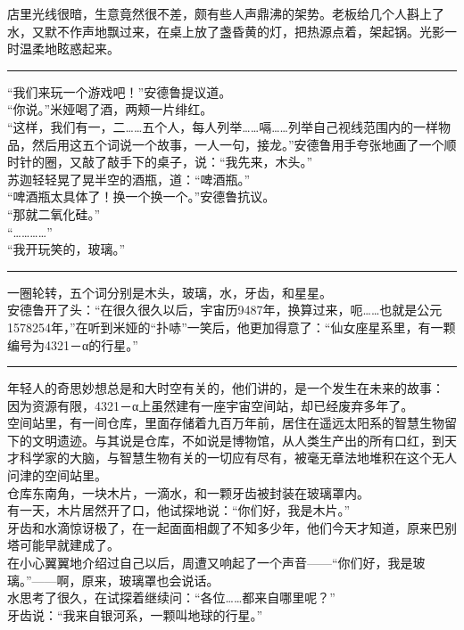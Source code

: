 \documentclass[oneside,11pt]{memoir} %
\begin{document}
\begin{CJK}{UTF8}{gbsn}
     店里光线很暗，生意竟然很不差，颇有些人声鼎沸的架势。老板给几个人斟上了水，又默不作声地飘过来，在桌上放了盏昏黄的灯，把热源点着，架起锅。光影一时温柔地眩惑起来。\\\indent
\rule{-3pt}{30pt}
     “我们来玩一个游戏吧！”安德鲁提议道。\\\indent
     “你说。”米娅喝了酒，两颊一片绯红。\\\indent
     “这样，我们有一，二……五个人，每人列举……嗝……列举自己视线范围内的一样物品，然后用这五个词说一个故事，一人一句，接龙。”安德鲁用手夸张地画了一个顺时针的圈，又敲了敲手下的桌子，说：“我先来，木头。”\\\indent
     苏迦轻轻晃了晃半空的酒瓶，道：“啤酒瓶。”\\\indent
     “啤酒瓶太具体了！换一个换一个。”安德鲁抗议。\\\indent
     “那就二氧化硅。”\\\indent
     “…………”\\\indent
     “我开玩笑的，玻璃。”\\\indent
\rule{-3pt}{30pt}
    一圈轮转，五个词分别是木头，玻璃，水，牙齿，和星星。\\\indent
    安德鲁开了头：“在很久很久以后，宇宙历9487年，换算过来，呃……也就是公元1578254年，”在听到米娅的“扑哧”一笑后，他更加得意了：“仙女座星系里，有一颗编号为4321－α的行星。”\\\indent
\rule{-3pt}{30pt}
    年轻人的奇思妙想总是和大时空有关的，他们讲的，是一个发生在未来的故事：\\\indent
    因为资源有限，4321－α上虽然建有一座宇宙空间站，却已经废弃多年了。\\\indent
    空间站里，有一间仓库，里面存储着九百万年前，居住在遥远太阳系的智慧生物留下的文明遗迹。与其说是仓库，不如说是博物馆，从人类生产出的所有口红，到天才科学家的大脑，与智慧生物有关的一切应有尽有，被毫无章法地堆积在这个无人问津的空间站里。\\\indent
    仓库东南角，一块木片，一滴水，和一颗牙齿被封装在玻璃罩内。\\\indent
    有一天，木片居然开了口，他试探地说：“你们好，我是木片。”\\\indent
    牙齿和水滴惊讶极了，在一起面面相觑了不知多少年，他们今天才知道，原来巴别塔可能早就建成了。\\\indent
    在小心翼翼地介绍过自己以后，周遭又响起了一个声音——“你们好，我是玻璃。”——啊，原来，玻璃罩也会说话。\\\indent
    水思考了很久，在试探着继续问：“各位……都来自哪里呢？”\\\indent
    牙齿说：“我来自银河系，一颗叫地球的行星。”\\\indent

\end{CJK}
\end{document}
